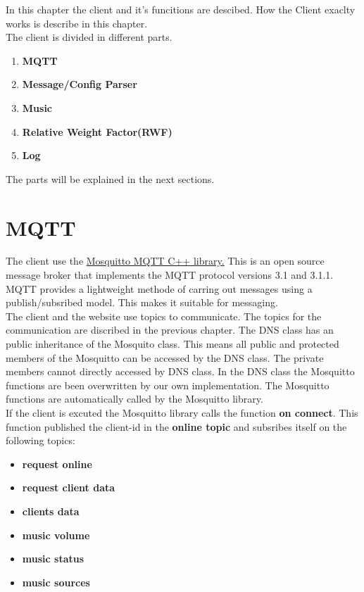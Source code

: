 In this chapter the client and it's funcitions are descibed. How the Client exaclty works is describe in this chapter.\\

The client is divided in different parts.
\small {
\begin{enumerate}
	\item 	\textbf{MQTT}
	\item 	\textbf{Message/Config Parser}
	\item	\textbf{Music}
	\item	\textbf{Relative Weight Factor(RWF)}
	\item 	\textbf{Log}
\end{enumerate}
}

The parts will be explained in the next sections.

\section{MQTT}

The client use the \href{http://mosquitto.org/}{Mosquitto MQTT C++ library.} This is an open source message broker that implements the MQTT protocol versions 3.1 and 3.1.1. MQTT provides a lightweight methode of carring out messages using a publish/subsribed model. This makes it suitable for  messaging.\\

The client and the website use topics to communicate. The topics for the communication are discribed in the previous chapter. The DNS class has an public inheritance of the Mosquito class. This means all public and protected members of the Mosquitto can be accessed by the DNS class. The private members cannot directly accessed by DNS class. In the DNS class the Mosquitto functions are been overwritten by our own implementation. The Mosquitto functions are automatically called by the Mosquitto library.\\

If the client is excuted the Mosquitto library calls the function
\textbf{ on connect}. This function published the client-id in the \textbf{online topic } and subsribes itself on the following topics:
\small{
\begin{itemize} [noitemsep, nolistsep]
	\item \textbf {request online}
	\item \textbf {request client data}
	\item \textbf {clients data}
	\item \textbf {music volume}
	\item \textbf {music status}
	\item \textbf {music sources\\}
\end{itemize}
}

